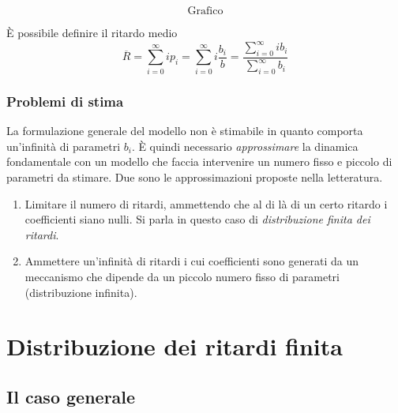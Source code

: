 \documentclass[a4paper]{report}
\newcounter{def}
\theoremstyle{remark}
\begin{document}
\begin{equation*}
\text{Grafico}
\end{equation*}%
\vspace{5cm}

\noindent \`{E} possibile definire il ritardo medio%
\begin{equation*}
\overline{R}=\sum_{i=0}^{\infty }ip_{i}=\sum_{i=0}^{\infty }i\frac{b_{i}}{b}=%
\frac{\sum_{i=0}^{\infty }ib_{i}}{\sum_{i=0}^{\infty }b_{i}}
\end{equation*}

\subsubsection{Problemi di stima}

La formulazione generale del modello non \`{e} stimabile in quanto comporta
un'infinit\`{a} di parametri $b_{i}$. \`{E} quindi necessario \emph{%
approssimare} la dinamica fondamentale con un modello che faccia intervenire
un numero fisso e piccolo di parametri da stimare. Due sono le
approssimazioni proposte nella letteratura.

\begin{enumerate}
\item Limitare il numero di ritardi, ammettendo che al di l\`{a} di un certo
ritardo i coefficienti siano nulli. Si parla in questo caso di \emph{%
distribuzione finita dei ritardi}.

\item Ammettere un'infinit\`{a} di ritardi i cui coefficienti sono generati
da un meccanismo che dipende da un piccolo numero fisso di parametri
(distribuzione infinita).
\end{enumerate}

\section{Distribuzione dei ritardi finita}

\subsection{Il caso generale}
\end{document}
